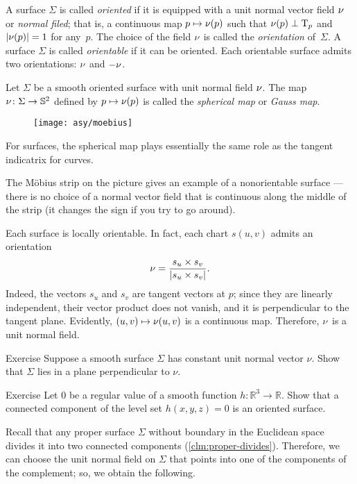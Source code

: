 A surface $\Sigma$ is called \emph{oriented} if it is equipped with a unit normal vector field $\nu$ or \emph{normal filed};
that is, a continuous map $p\mapsto \nu(p)$ such that $\nu(p)\perp\mathrm{T}_p$ and $|\nu(p)|=1$ for any~$p$.
The choice of the field $\nu$ is called the {}\emph{orientation} of~$\Sigma$.
A surface $\Sigma$ is called {}\emph{orientable} if it can be oriented.
Each orientable surface admits two orientations: $\nu$ and $-\nu$.

Let $\Sigma$ be a smooth oriented surface with unit normal field $\nu$.
The map $\nu\colon\Sigma\to \mathbb{S}^2$ defined by $p\mapsto \nu(p)$ is called the \emph{spherical map} or \emph{Gauss map}.

\begin{wrapfigure}{r}{42 mm}
\vskip-7mm
\centering
\texttt{[image: asy/moebius]}
\vskip-1mm
\end{wrapfigure}

For surfaces, the spherical map plays essentially the same role as the tangent indicatrix for curves.

The Möbius strip on the picture gives an example of a nonorientable surface --- there is no choice of a normal vector field that is continuous along the middle of the strip (it changes the sign if you try to go around).

Each surface is locally orientable.
In fact, each chart $s(u,v)$ admits an orientation 
\[\nu=
\frac{s_u\times s_v}
{\left|s_u\times s_v\right|}.\]
Indeed, the vectors $s_u$ and $s_v$ are tangent vectors at $p$; 
since they are linearly independent, their vector product does not vanish, and it is perpendicular to the tangent plane.
Evidently, $(u,v)\mapsto \nu(u,v)$ is a continuous map.
Therefore, $\nu$ is a unit normal field. 

\begin{thm}{Exercise}\label{ex:const-normal}
Suppose a smooth surface $\Sigma$ has constant unit normal vector $\nu$.
Show that $\Sigma$ lies in a plane perpendicular to $\nu$.
\end{thm}

\begin{thm}{Exercise}\label{ex:implicit-orientable}
Let $0$ be a regular value of a smooth function $h:\mathbb{R}^3\to\mathbb{R}$.
Show that a connected component of the level set $h(x,y,z)=0$ is an oriented surface.
\end{thm}

Recall that any proper surface $\Sigma$ without boundary in the Euclidean space divides it into two connected components (\ref{clm:proper-divides}).
Therefore, we can choose the unit normal field on $\Sigma$ that points into one of the components of the complement; so, we obtain the following.


